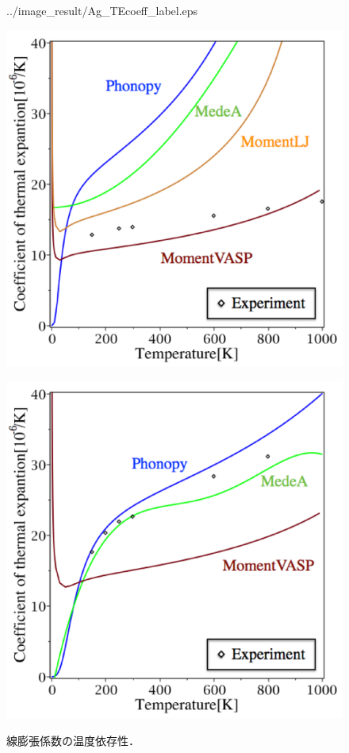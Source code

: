 \begin{figure}[htbp]
\begin{minipage}[b]{0.5\linewidth}
  {../image_result/Ag_TEcoeff_label.eps}
  \label{he6}
 \end{minipage}
 \hspace{10cm}
 \begin{minipage}[b]{0.5\linewidth}
  \centering
  \includegraphics[keepaspectratio, scale=0.42]
  {../image_result/Au_TEcoeff_label.eps}
  \label{he7}
 \end{minipage}
 \begin{minipage}[b]{0.5\linewidth}
  \centering
  \includegraphics[keepaspectratio, scale=0.42]
  {../image_result/Al_TEcoeff_label.eps}
  \label{he8}
 \end{minipage}
 \caption{線膨張係数の温度依存性．}\label{fig:heatexpantion2}
\end{figure}


